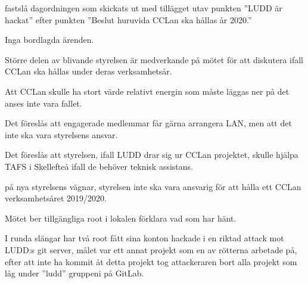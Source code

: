 \documentclass{protokoll}
\begin{document}
\newpage  


\begin{beslut}
     \att fastslå dagordningen som skickats ut med tillägget utav punkten 
     ''LUDD är hackat'' efter punkten ''Beslut huruvida CCLan ska hållas år
     2020.''
\end{beslut}

Inga bordlagda ärenden.

Större delen av blivande styrelsen är medverkande på mötet för att diskutera
ifall CCLan ska hållas under deras verksamhetsår. 

Att CCLan skulle ha stort värde relativt energin som måste läggas ner på det
anses inte vara fallet. 

Det föreslås att engagerade medlemmar får gärna arrangera LAN, men att det inte
ska vara styrelsens ansvar.

Det föreslås att styrelsen, ifall LUDD drar sig ur CCLan projektet, skulle
hjälpa TAFS i Skellefteå ifall de behöver teknisk assistans. 

\begin{beslut}
  \att på nya styrelsens vägnar, styrelsen inte ska vara ansvarig för att hålla
  ett CCLan verksamhetsåret 2019/2020.
\end{beslut}

Mötet ber tillgängliga root i lokalen förklara vad som har hänt.  

I runda slängar har två root fått sina konton hackade i en riktad attack mot
LUDD:s git server, målet var ett annat projekt som en av rötterna arbetade på,
efter att inte ha kommit åt detta projekt tog attackeraren bort alla projekt
som låg under ''ludd'' gruppeni på GitLab. 
\end{document}
